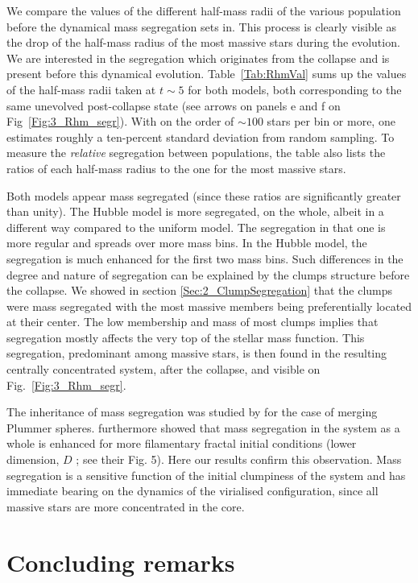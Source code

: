 We compare the values of the different half-mass radii of the various population before the dynamical mass segregation sets in. This process is clearly visible as the drop of the half-mass radius of the most massive stars during the evolution. We are interested in the segregation which originates from the collapse and is present before this dynamical evolution. Table~\ref{Tab:RhmVal} sums up the values of the half-mass radii taken at $t\sim5$ for both models, both corresponding to the same unevolved post-collapse state (see arrows on panels e and f on Fig~\ref{Fig:3_Rhm_segr}). With on the order of $\sim 100$ stars per bin or more, one estimates roughly a ten-percent standard deviation from random sampling. To measure the \textit{relative} segregation between populations, the table also lists the ratios of each half-mass radius to the one for the most massive stars. 

Both models appear mass segregated (since these ratios are significantly greater than unity). The Hubble model is more segregated, on the whole, albeit in a different way compared to the uniform model. The segregation in that one is more regular and spreads over more mass bins. In the Hubble model, the segregation is much enhanced for the first two mass bins. Such differences in the degree and nature of segregation can be explained by the clumps structure before the collapse. We showed in section \ref{Sec:2_ClumpSegregation} that the clumps were mass segregated with the most massive members being preferentially located at their center. The low membership and mass of most clumps implies that segregation mostly affects the very top of the stellar mass function. This segregation, predominant among massive stars, is then found in the resulting centrally concentrated system, after the collapse, and visible on Fig.~\ref{Fig:3_Rhm_segr}. 

The inheritance of mass segregation was studied by \cite{McMillan2007} for the case of merging Plummer spheres. \cite{Allison2010} furthermore showed that mass segregation in the system as a whole is enhanced for more filamentary  fractal initial conditions (lower dimension, $D$ ; see their Fig. 5). Here our results confirm this observation. Mass segregation is a sensitive function of the initial clumpiness of the system and has immediate bearing on the dynamics of the virialised configuration, since all massive stars are more concentrated in the core.


\section{Concluding remarks}


